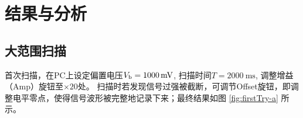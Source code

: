 \documentclass[aps,pre,12pt,preprint,%
	onecolumn,showpacs,showkeys,nofootinbib]{revtex4-1}
\begin{document}
\section{结果与分析}
%
%
\subsection{大范围扫描}
	首次扫描，在PC上设定偏置电压$V_\textup{b} = \SI{1000}{\mV}$, 扫描时间$T = \SI{2000}{\ms}$, 调整增益（Amp）旋钮至$\boxed{\times 20}$处。
	扫描时若发现信号过强被截断，可调节Offset旋钮，即调整电平零点，使得信号波形被完整地记录下来；最终结果如图 \ref{fig:firstTry-a} 所示。
	
\end{document}
